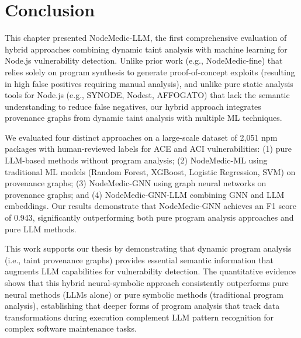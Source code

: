 \documentclass[12pt,openany,oneside,table]{cmuthesis}
\begin{document}
\section{Conclusion}
This chapter presented NodeMedic-LLM, the first comprehensive evaluation of hybrid approaches combining dynamic taint analysis with machine learning for Node.js vulnerability detection. Unlike prior work (e.g., NodeMedic-fine) that relies solely on program synthesis to generate proof-of-concept exploits (resulting in high false positives requiring manual analysis), and unlike pure static analysis tools for Node.js (e.g., SYNODE, Nodest, AFFOGATO) that lack the semantic understanding to reduce false negatives, our hybrid approach integrates provenance graphs from dynamic taint analysis with multiple ML techniques.

We evaluated four distinct approaches on a large-scale dataset of 2,051 npm packages with human-reviewed labels for ACE and ACI vulnerabilities: (1) pure LLM-based methods without program analysis; (2) NodeMedic-ML using traditional ML models (Random Forest, XGBoost, Logistic Regression, SVM) on provenance graphs; (3) NodeMedic-GNN using graph neural networks on provenance graphs; and (4) NodeMedic-GNN-LLM combining GNN and LLM embeddings. Our results demonstrate that NodeMedic-GNN achieves an F1 score of 0.943, significantly outperforming both pure program analysis approaches and pure LLM methods.

This work supports our thesis by demonstrating that dynamic program analysis (i.e., taint provenance graphs) provides essential semantic information that augments LLM capabilities for vulnerability detection. The quantitative evidence shows that this hybrid neural-symbolic approach consistently outperforms pure neural methods (LLMs alone) or pure symbolic methods (traditional program analysis), establishing that deeper forms of program analysis that track data transformations during execution complement LLM pattern recognition for complex software maintenance tasks.




\backmatter
\renewcommand{\bibsection}{\chapter{\bibname}}

 
\end{document}
